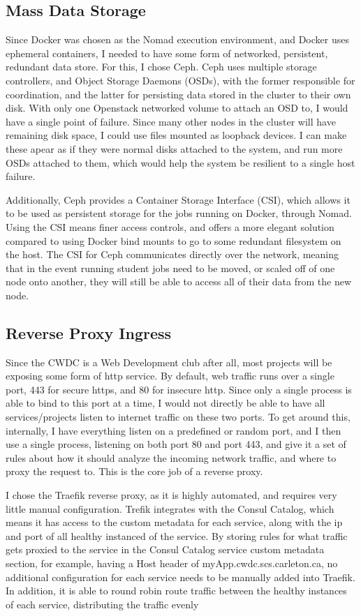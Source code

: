 \documentclass{article}
\begin{document}
\subsection{Mass Data Storage}
Since Docker was chosen as the Nomad execution environment, and Docker uses ephemeral containers, I needed to have some form of networked, persistent, redundant data store. For this, I chose Ceph. Ceph uses multiple storage controllers, and Object Storage Daemons (OSDs), with the former responsible for coordination, and the latter for persisting data stored in the cluster to their own disk. With only one Openstack networked volume to attach an OSD to, I would have a single point of failure. Since many other nodes in the cluster will have remaining disk space, I could use files mounted as loopback devices. I can make these apear as if they were normal disks attached to the system, and run more OSDs attached to them, which would help the system be resilient to a single host failure. 

Additionally, Ceph provides a Container Storage Interface (CSI), which allows it to be used as persistent storage for the jobs running on Docker, through Nomad. Using the CSI means finer access controls, and offers a more elegant solution compared to using Docker bind mounts to go to some redundant filesystem on the host. The CSI for Ceph communicates directly over the network, meaning that in the event running student jobs need to be moved, or scaled off of one node onto another, they will still be able to access all of their data from the new node.

\subsection{Reverse Proxy Ingress}
Since the CWDC is a Web Development club after all, most projects will be exposing some form of http service. By default, web traffic runs over a single port, 443 for secure https, and 80 for insecure http. Since only a single process is able to bind to this port at a time, I would not directly be able to have all services/projects listen to internet traffic on these two ports. To get around this, internally, I have everything listen on a predefined or random port, and I then use a single process, listening on both port 80 and port 443, and give it a set of rules about how it should analyze the incoming network traffic, and where to proxy the request to. This is the core job of a reverse proxy.

I chose the Traefik reverse proxy, as it is highly automated, and requires very little manual configuration. Trefik integrates with the Consul Catalog, which means it has access to the custom metadata for each service, along with the ip and port of all healthy instanced of the service. By storing rules for what traffic gets proxied to the service in the Consul Catalog service custom metadata section, for example, having a Host header of myApp.cwdc.scs.carleton.ca, no additional configuration for each service needs to be manually added into Traefik. In addition, it is able to round robin route traffic between the healthy instances of each service, distributing the traffic evenly
\end{document}
